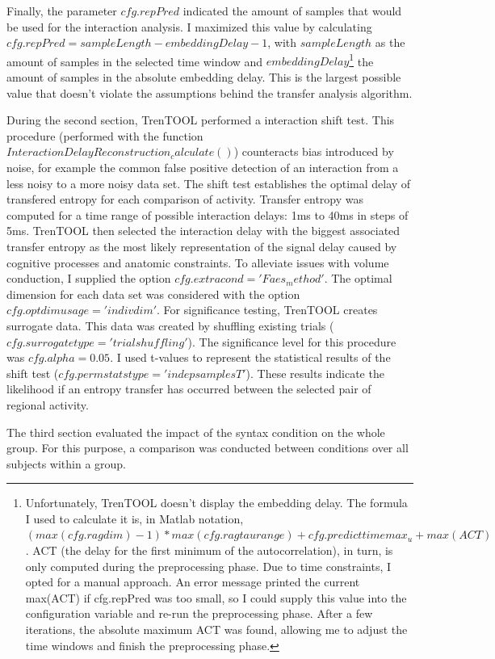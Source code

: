 Finally, the parameter $cfg.repPred$ indicated the amount of samples that would be used for the interaction analysis.
I maximized this value by calculating $cfg.repPred = sampleLength - embeddingDelay - 1$, with $sampleLength$ as the amount of samples in the selected time window and $embeddingDelay$\footnote{Unfortunately, TrenTOOL doesn't display the embedding delay. The formula I used to calculate it is, in Matlab notation, $(max(cfg.ragdim)-1) * max(cfg.ragtaurange) + cfg.predicttimemax_u + max(ACT)$. ACT (the delay for the first minimum of the autocorrelation), in turn, is only computed during the preprocessing phase. Due to time constraints, I opted for a manual approach. An error message printed the current max(ACT) if cfg.repPred was too small, so I could supply this value into the configuration variable and re-run the preprocessing phase. After a few iterations, the absolute maximum ACT was found, allowing me to adjust the time windows and finish the preprocessing phase.} the amount of samples in the absolute embedding delay.
This is the largest possible value that doesn't violate the assumptions behind the transfer analysis algorithm.


During the second section, TrenTOOL performed a interaction shift test.
This procedure (performed with the function $InteractionDelayReconstruction_calculate()$) counteracts bias introduced by noise, for example the common false positive detection of an interaction from a less noisy to a more noisy data set.
The shift test establishes the optimal delay of transfered entropy for each comparison of activity.
Transfer entropy was computed for a time range of possible interaction delays: 1ms to 40ms in steps of 5ms.
TrenTOOL then selected the interaction delay with the biggest associated transfer entropy as the most likely representation of the signal delay caused by cognitive processes and anatomic constraints.
To alleviate issues with volume conduction, I supplied the option $cfg.extracond = 'Faes_method'$.
The optimal dimension for each data set was considered with the option $cfg.optdimusage = 'indivdim'$.
For significance testing, TrenTOOL creates surrogate data.
This data was created by shuffling existing trials ($cfg.surrogatetype = 'trialshuffling'$).
The significance level for this procedure was $cfg.alpha = 0.05$.
I used t-values to represent the statistical results of the shift test ($cfg.permstatstype = 'indepsamplesT'$).
These results indicate the likelihood if an entropy transfer has occurred between the selected pair of regional activity.


The third section evaluated the impact of the syntax condition on the whole group.
For this purpose, a comparison was conducted between conditions over all subjects within a group.
